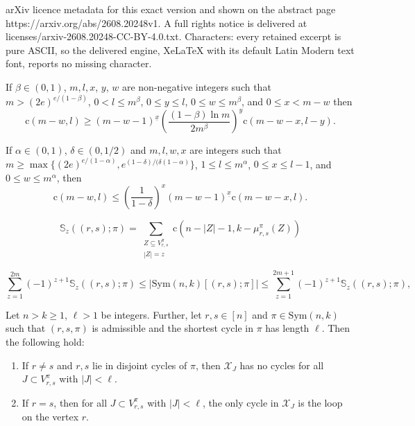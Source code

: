 \documentclass[10pt,a4paper]{amsart}
\newcommand{\bb}{\mathbb}
\newcommand{\ff}[1]{^{\underline{#1}}}
\newcommand{\mcal}{\mathcal}
\newcommand{\st}{\mathrm{c}}
\newcommand{\sym}{\mathrm{Sym}}
\begin{document}
arXiv licence metadata for this exact version and shown on the abstract page https://arxiv.org/abs/2608.20248v1. A full rights notice is delivered at licenses/arxiv-2608.20248-CC-BY-4.0.txt. Characters: every retained excerpt is pure ASCII, so the delivered engine, XeLaTeX with its default Latin Modern text font, reports no missing character.
\begin{lem}\label{lem:keyineq}
If $\beta \in (0,1)$, $m,l,x$, $y$, $w$ are non-negative integers such that $m>(2e)^{e/(1-\beta)}$, $0<l\leq m^{\beta}$, $0\leq y\leq l$, $0\leq w\leq m^{\beta}$, and $0\leq x< m-w$ then 
\[ \st(m-w,l) \geq  (m-w-1)\ff{x} \left(\dfrac{(1-\beta)\ln m}{2m^{\beta}} \right)^{y} \st(m-w-x,l-y). \]
\end{lem}

\begin{lem}\label{lem:keyineq1}
If $\alpha \in(0, 1)$, $\delta \in (0,1/2)$ and $m,l,w,x$ are  integers such that\\ $m\geq \max\{(2e)^{e/(1-\alpha)}, e^{(1-\delta)/(\delta(1-\alpha)}\}$, $1\leq l \leq m^{\alpha}$, $0\leq x \leq l-1$, and $0\leq w \leq m^{\alpha}$, then 
\[\st(m-w,l) \leq \left(\dfrac{1}{1-\delta} \right)^{x} (m-w-1)\ff{x} \st(m-w-x,l).\]
\end{lem}

\begin{equation}\label{eq:bonfterm}
\bb{S}_{z}((r,s);\pi) = \sum\limits_{\substack{Z \subseteq V_{r,s}^{\pi}\\  |Z|=z }} \st(n-|Z|-1,k-\mu_{r,s}^{\pi}(Z))
\end{equation}

\begin{equation}\label{eq:bonf}
\sum\limits_{z=1}^{2m} (-1)^{z+1}\bb{S}_{z}((r,s);\pi) \leq |\sym(n,k)[(r,s);\pi]| \leq \sum\limits_{z=1}^{2m+1} (-1)^{z+1}\bb{S}_{z}((r,s);\pi),
\end{equation}

\begin{cor}\label{cor:xjlongcycle}
Let $n>k\geq1$, $\ell>1$ be integers. Further, let $r,s\in [n]$ and $\pi \in \sym(n,k)$ such that $(r,s,\pi)$ is admissible and the shortest cycle in $\pi$  has length $\ell$. Then the following hold:
\begin{enumerate}
\item If $r\neq s$ and $r,s$ lie in disjoint cycles of $\pi$, then $\mcal{X}_{J}$ has no cycles for all $J\subset V_{r,s}^{\pi}$ with $|J|<\ell$.
\item If $r=s$, then for all $J\subset V_{r,s}^{\pi}$ with $|J|<\ell$, the only cycle in $\mcal{X}_{J}$ is the loop on the vertex $r$.
\end{enumerate}
\end{cor}
\end{document}
